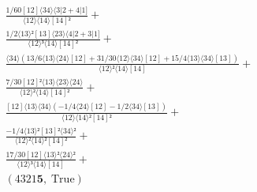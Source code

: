 \documentclass[varwidth, border=5pt]{standalone}
\begin{document}
\begin{my}
$\begin{gathered}
\scriptscriptstyle\frac{1/60[12]⟨34⟩⟨3|2+4|1]}{⟨12⟩⟨14⟩[14]²} +\\
\scriptscriptstyle\frac{1/2⟨13⟩²[13]⟨23⟩⟨4|2+3|1]}{⟨12⟩³⟨14⟩[14]²} +\\
\scriptscriptstyle\frac{⟨34⟩(13/6⟨13⟩⟨24⟩[12]+31/30⟨12⟩⟨34⟩[12]+15/4⟨13⟩⟨34⟩[13])}{⟨12⟩²⟨14⟩[14]} +\\
\scriptscriptstyle\frac{7/30[12]²⟨13⟩⟨23⟩⟨24⟩}{⟨12⟩²⟨14⟩[14]²} +\\
\scriptscriptstyle\frac{[12]⟨13⟩⟨34⟩(-1/4⟨24⟩[12]-1/2⟨34⟩[13])}{⟨12⟩⟨14⟩²[14]²} +\\
\scriptscriptstyle\frac{-1/4⟨13⟩²[13]²⟨34⟩²}{⟨12⟩²⟨14⟩²[14]²} +\\
\scriptscriptstyle\frac{17/30[12]⟨13⟩²⟨24⟩²}{⟨12⟩³⟨14⟩[14]} +\\
\scriptscriptstyle(4321𝟓,\;\text{True}) \phantom{+}
\end{gathered}$
\end{my}
\end{document}
